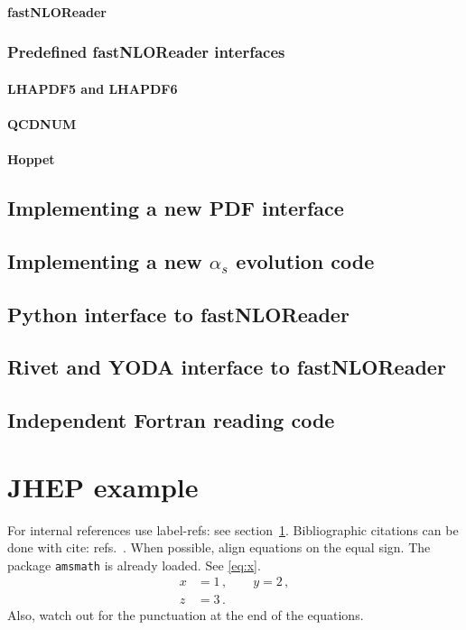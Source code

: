 \documentclass[a4paper,11pt]{article}
\begin{document}
\paragraph{fastNLOReader}
\subsubsection{Predefined fastNLOReader interfaces}
\paragraph{LHAPDF5 and LHAPDF6}
\paragraph{QCDNUM}
\paragraph{Hoppet}
\subsection{Implementing a new PDF interface}
\subsection{Implementing a new $\alpha_s$ evolution code}

\subsection{Python interface to fastNLOReader}

\subsection{Rivet and YODA interface to fastNLOReader}

\subsection{Independent Fortran reading code}


\clearpage
\appendix
\section{JHEP example}
\label{sec:intro}

For internal references use label-refs: see section~\ref{sec:intro}.
Bibliographic citations can be done with cite: refs.~\cite{a,b,c}.
When possible, align equations on the equal sign. The package
\texttt{amsmath} is already loaded. See \eqref{eq:x}.
\begin{equation}
\label{eq:x}
\begin{split}
x &= 1 \,,
\qquad
y = 2 \,,
\\
z &= 3 \,.
\end{split}
\end{equation}
Also, watch out for the punctuation at the end of the equations.
\end{document}
